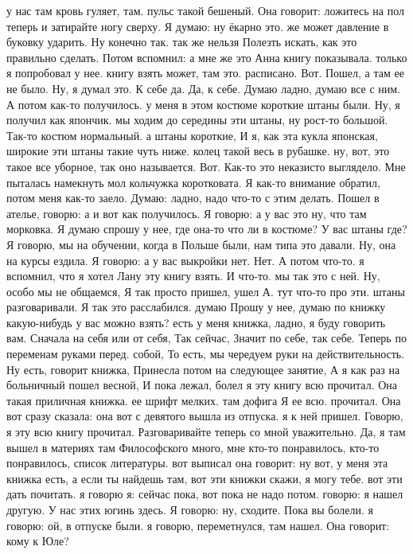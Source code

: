 у нас там кровь гуляет, там.
пульс такой бешеный. Она говорит: ложитесь на пол теперь и затирайте ногу сверху.
Я думаю: ну ёкарно это.
же может давление в буковку ударить. Ну конечно так. так же нельзя Полезть искать, как это правильно сделать. Потом вспомнил:
а мне же это Анна книгу показывала.
только я попробовал у нее.
книгу взять может, там это.
расписано.
Вот.
Пошел, а там ее не было.
Ну, я думал это.
К себе да.
Да, к себе.
Думаю ладно, думаю все с ним.
А потом как-то получилось. у меня в этом костюме короткие штаны были.
Ну, я получил как япончик. мы ходим до середины эти штаны, ну рост-то большой.
Так-то костюм нормальный.
а штаны короткие, И я, как эта кукла японская, широкие эти штаны такие чуть ниже.
колец такой весь в рубашке. ну, вот, это такое все уборное, так оно называется.
Вот.
Как-то это неказисто выглядело.
Мне пыталась намекнуть мол кольчужка коротковата.
Я как-то внимание обратил, потом меня как-то заело.
Думаю: ладно, надо что-то с этим делать.
Пошел в ателье, говорю: а и вот как получилось.
Я говорю: а у вас это ну, что там морковка.
Я думаю спрошу у нее, где она-то что ли в костюме?
У вас штаны где?
Я говорю, мы на обучении, когда в Польше были, нам типа это давали.
Ну, она на курсы ездила.
Я говорю: а у вас выкройки нет.
Нет.
А потом что-то. я вспомнил, что я хотел Лану эту книгу взять.
И что-то.
мы так это с ней.
Ну, особо мы не общаемся, Я так просто пришел, ушел А.
тут что-то про эти.
штаны разговаривали. Я так это расслабился. думаю Прошу у нее, думаю по книжку какую-нибудь у вас можно взять?
есть у меня книжка, ладно, я буду говорить вам.
Сначала на себя или от себя, Так сейчас, Значит по себе, так себе.
Теперь по переменам руками перед.
собой, То есть, мы чередуем руки на действительность. Ну есть, говорит книжка, Принесла потом на следующее занятие, А я как раз на больничный пошел весной, И пока лежал, болел я эту
книгу всю прочитал. Она такая приличная книжка.
ее шрифт мелких.
там дофига Я ее всю.
прочитал.
Она вот сразу сказала: она вот с девятого вышла из отпуска. я к ней пришел.
Говорю, я эту всю книгу прочитал.
Разговаривайте теперь со мной уважительно.
Да, я там вышел в материях там Философского много, мне кто-то понравилось, кто-то понравилось, список литературы. вот выписал она говорит: ну вот, у меня эта книжка есть, а если ты найдешь там, вот эти книжки скажи, я могу тебе.
вот эти дать почитать. я говорю я:
сейчас пока, вот пока не надо потом.
говорю: я нашел другую.
У нас этих югинь здесь.
Я говорю: ну, сходите.
Пока вы болели. я говорю: ой, в отпуске были. я говорю, переметнулся, там нашел.
Она говорит: кому к Юле?
